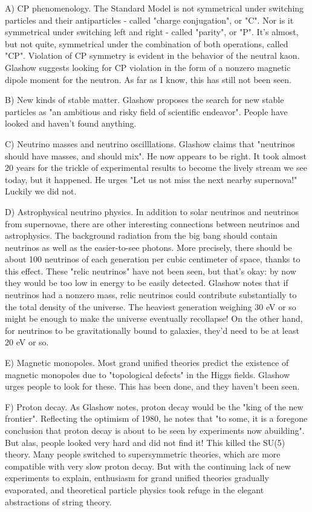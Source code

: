 A) CP phenomenology.  The Standard Model is not symmetrical under
switching particles and their antiparticles - called "charge
conjugation", or "C".  Nor is it symmetrical under
switching left and right - called "parity", or "P".
It's almost, but not quite, symmetrical under the combination of both
operations, called "CP".  Violation of CP symmetry is evident
in the behavior of the neutral kaon.  Glashow suggests looking for CP
violation in the form of a nonzero magnetic dipole moment for the
neutron.  As far as I know, this has still not been seen.

B) New kinds of stable matter.  Glashow proposes the search for new
stable particles as "an ambitious and risky field of scientific
endeavor".  People have looked and haven't found anything.

C) Neutrino masses and neutrino oscilllations.  Glashow claims that
"neutrinos should have masses, and should mix".  He now appears to 
be right.  It took almost 20 years for the trickle of experimental
results to become the lively stream we see today, but it happened.
He urges "Let us not miss the next nearby supernova!"  Luckily we
did not.

D) Astrophysical neutrino physics.  In addition to solar neutrinos and
neutrinos from supernovae, there are other interesting connections
between neutrinos and astrophysics.  The background radiation from the
big bang should contain neutrinos as well as the easier-to-see photons.
More precisely, there should be about 100 neutrinos of each generation
per cubic centimeter of space, thanks to this effect.  These "relic
neutrinos" have not been seen, but that's okay: by now they would be too
low in energy to be easily detected.   Glashow notes that if neutrinos
had a nonzero mass, relic neutrinos could contribute substantially to
the total density of the universe.  The heaviest generation weighing 30
eV or so might be enough to make the universe eventually recollapse! On
the other hand, for neutrinos to be gravitationally bound to galaxies,
they'd need to be at least 20 eV or so.   

E) Magnetic monopoles.  Most grand unified theories predict the
existence of magnetic monopoles due to "topological defects"
in the Higgs fields.  Glashow urges people to look for these.  This has
been done, and they haven't been seen.

F) Proton decay.  As Glashow notes, proton decay would be the "king
of the new frontier".  Reflecting the optimism of 1980, he notes
that "to some, it is a foregone conclusion that proton decay is
about to be seen by experiments now abuilding".  But alas, people
looked very hard and did not find it!  This killed the SU(5) theory.
Many people switched to supersymmetric theories, which are more
compatible with very slow proton decay.  But with the continuing lack of
new experiments to explain, enthusiasm for grand unified theories
gradually evaporated, and theoretical particle physics took refuge in
the elegant abstractions of string theory.


